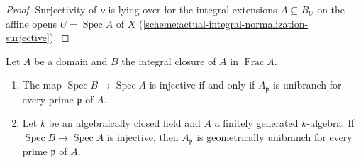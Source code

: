\begin{proof}
Surjectivity of $\nu$ is lying over for the integral extensions $A\subseteq B_U$ on the affine
opens $U=\operatorname{Spec}A$ of $X$ (\ref{scheme:actual-integral-normalization-surjective}).
\end{proof}

\begin{lemma}\label{lem:var-unibranch-ring}
\leanok
{}
Let $A$ be a domain and $B$ the integral closure of $A$ in $\operatorname{Frac}A$.
\begin{enumerate}
\item The map $\operatorname{Spec}B\to\operatorname{Spec}A$ is injective if and only if
  $A_{\mathfrak p}$ is unibranch for every prime $\mathfrak p$ of $A$.
\item Let $k$ be an algebraically closed field and $A$ a finitely generated $k$-algebra. If
  $\operatorname{Spec}B\to\operatorname{Spec}A$ is injective, then $A_{\mathfrak p}$ is
  geometrically unibranch for every prime $\mathfrak p$ of $A$.
\end{enumerate}
\end{lemma}

